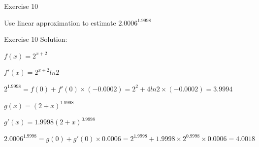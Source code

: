 \begin{frame}{Exercise 10}
    \begin{block}{}
        Use linear approximation to estimate $2.0006^{1.9998}$
    \end{block}
\end{frame}



\begin{frame}{Exercise 10}
    Solution:

    \linespread{2}

    $f(x) = 2^{x+2}$

    $f'(x) = 2^{x+2}ln2$

    $2^{1.9998} = f(0) + f'(0) \times (-0.0002) =  2^2 + 4ln2 \times (-0.0002) = 3.9994$

    $g(x) = (2+x)^{1.9998}$

    $g'(x) = 1.9998(2+x)^{0.9998}$

    $2.0006^{1.9998} = g(0) + g'(0)\times 0.0006 = 2^{1.9998} + 1.9998\times 2^{0.9998}\times 0.0006 = 4.0018$

\end{frame}







